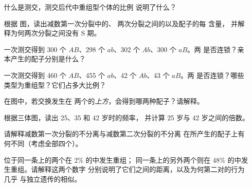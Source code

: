 \begin{exercise}[$\star$]\label{exo:g12:meiosis-genetic-shuffling:5}
什么是测交，测交后代中重组型个体的比例
说明了什么？
\end{exercise}

\begin{exercise}[$\star\star$]\label{exo:g12:meiosis-genetic-shuffling:6}
根据  图，读出减数第一次分裂中的、
两次分裂之间的以及配子的每  含量，
并解释为何两次分裂之间没有 S 期。
\end{exercise}

\begin{exercise}[$\star\star$]\label{exo:g12:meiosis-genetic-shuffling:7}
一次测交得到 300 个 $AB$、298 个 $ab$、302 个 $Ab$、300 个 $aB$。两
是否连锁？亲本产生的配子分别是什么？
\end{exercise}

\begin{exercise}[$\star\star$]\label{exo:g12:meiosis-genetic-shuffling:8}
一次测交得到 460 个 $AB$、455 个 $ab$、42 个 $Ab$、43 个 $aB$。两
是否连锁？哪些类型为重组型？它们占多大比例？
\end{exercise}

\begin{exercise}[$\star\star$]\label{exo:g12:meiosis-genetic-shuffling:9}
在图中，若交换发生在
两个的\emph{上方}，会得到哪两种配子？请解释。
\end{exercise}

\begin{exercise}[$\star\star$]\label{exo:g12:meiosis-genetic-shuffling:10}
根据三体图，读出 25、35 和 42 岁时的频率，
并计算 25 岁与 42 岁之间的倍数。
\end{exercise}

\begin{exercise}[$\star\star$]\label{exo:g12:meiosis-genetic-shuffling:11}
请解释减数第一次分裂的不分离与减数第二次分裂的不分离
在所产生的配子上有何不同（考虑全部四个）。
\end{exercise}

\begin{exercise}[$\star\star\star$]\label{exo:g12:meiosis-genetic-shuffling:12}
位于同一条上的两个在 2\% 的中发生重组；
同一条上的另外两个则在 48\% 的中发生重组。请解释这两个数字
分别说明了它们之间的距离，以及为何第二对的行为几乎
与独立遗传的相似。
\end{exercise}

